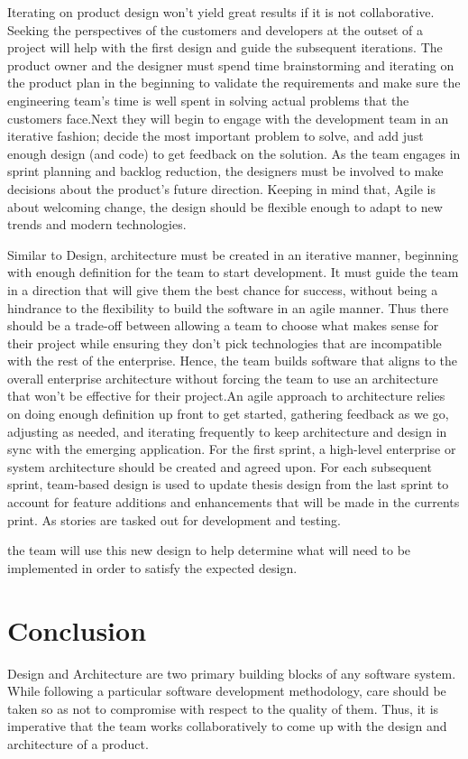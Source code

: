 \documentclass[sigplan,screen]{acmart}
\begin{document}
Iterating on product design won't yield great results if it is not collaborative. Seeking the perspectives of the customers and developers at the outset of a project will help with the first design and guide the subsequent iterations. The product owner and the designer must spend time brainstorming and iterating on the product plan in the beginning to validate the requirements and make sure the engineering team’s time is well spent in solving actual problems that the customers face.Next they will begin to engage with the development team in an iterative fashion; decide the most important problem to solve, and add just enough design (and code) to get feedback on the solution. As the team engages in sprint planning and backlog reduction, the designers must be involved to make decisions about the product’s future direction. Keeping in mind that, Agile is about welcoming change, the design should be flexible enough to adapt to new trends and modern technologies.

Similar to Design, architecture must be created in an iterative manner, beginning with enough definition for the team to start development. It must guide the team in a direction that will give them the best chance for success, without being a hindrance to the flexibility to build the software in an agile manner. Thus there should be a trade-off between allowing a team to choose what makes sense for their project while ensuring they don't pick technologies that are incompatible with the rest of the enterprise. Hence, the team builds software that aligns to the overall enterprise architecture without forcing the team to use an architecture that won’t be effective for their project.An agile approach to architecture relies on doing enough definition up front to get started, gathering feedback as we go, adjusting as needed, and iterating frequently to keep architecture and design in sync with the emerging application. For the first sprint, a high-level enterprise or system architecture should be created and agreed upon. For each subsequent sprint, team-based design is used to update thesis design from the last sprint to account for feature additions and enhancements that will be made in the currents print. As stories are tasked out for development and testing.

the team will use this new design to help determine what will need to be implemented in order to satisfy the expected design.

\section{Conclusion}
Design and Architecture are two primary building blocks of any software system. While following a particular software development methodology, care should be taken so as not to compromise with respect to the quality of them. Thus, it is imperative that the team works collaboratively to come up with the design and architecture of a product.




\end{document}
